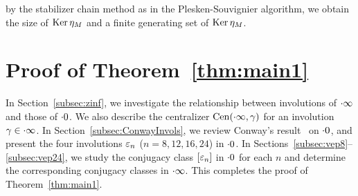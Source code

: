 \documentclass{amsart} %
\begin{document}
by the stabilizer chain method as in the Plesken-Souvignier algorithm, 
we obtain the size of $\operatorname{Ker} \eta_M$
and a finite generating set of $\operatorname{Ker} \eta_M$.
%
%
%
\section{Proof of Theorem~\ref{thm:main1}}\label{sec:proofofmain1}
%
In Section~\ref{subsec:zinf}, 
we investigate the relationship between involutions of $\cdot \infty$ and those of $\cdot 0$.
We also describe the centralizer $\mathrm{Cen}(\cdot \infty, \gamma)$
for an involution $\gamma\in \cdot \infty$.
In Section~\ref{subsec:ConwayInvols}, 
we review Conway's result~\cite[Chapter 10]{theCSbook} on $\cdot 0$, 
and present the four involutions $\varepsilon_n$ ($n=8,12,16,24$) 
 in $\cdot 0$.
In Sections~\ref{subsec:vep8}--\ref{subsec:vep24}, 
we study the conjugacy class $[\varepsilon_n]$ in $\cdot 0$ for each $n$ 
and determine the corresponding conjugacy classes in $\cdot \infty$. This completes the proof of Theorem~\ref{thm:main1}.
%
%
\end{document}
